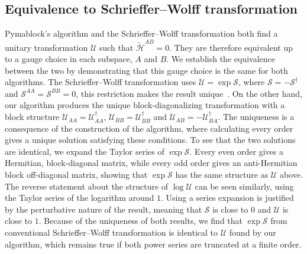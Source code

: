 \subsection{Equivalence to Schrieffer--Wolff transformation}
\label{seq:SW_equivalence}
Pymablock's algorithm and the Schrieffer--Wolff transformation both find a unitary transformation $\mathcal{U}$ such that $\tilde{\mathcal{H}}^{AB}=0$.
They are therefore equivalent up to a gauge choice in each subspace, $A$ and $B$.
We establish the equivalence between the two by demonstrating that this gauge choice is the same for both algorithms.
The Schrieffer--Wolff transformation uses $\mathcal{U} = \exp \mathcal{S}$, where $\mathcal{S} = -\mathcal{S}^\dagger$ and $\mathcal{S}^{AA} = \mathcal{S}^{BB} = 0$, this restriction makes the result unique~\cite{Bravyi_2011}.
On the other hand, our algorithm produces the unique block-diagonalizing transformation with a block structure $\mathcal{U}_{AA} = \mathcal{U}_{AA}^{\dag}$, $\mathcal{U}_{BB} = \mathcal{U}_{BB}^{\dag}$ and $\mathcal{U}_{AB} = -\mathcal{U}_{BA}^{\dag}$.
The uniqueness is a consequence of the construction of the algorithm, where calculating every order gives a unique solution satisfying these conditions.
To see that the two solutions are identical, we expand the Taylor series of $\exp \mathcal{S}$.
Every even order gives a Hermitian, block-diagonal matrix, while every odd order gives an anti-Hermitian block off-diagonal matrix, showing that $\exp \mathcal{S}$ has the same structure as $\mathcal{U}$ above.
The reverse statement about the structure of $\log \mathcal{U}$ can be seen similarly, using the Taylor series of the logarithm around $1$.
Using a series expansion is justified by the perturbative nature of the result, meaning that $\mathcal{S}$ is close to $0$ and $\mathcal{U}$ is close to $1$.
Because of the uniqueness of both results, we find that $\exp \mathcal{S}$ from conventional Schrieffer--Wolff transformation is identical to $\mathcal{U}$ found by our algorithm, which remains true if both power series are truncated at a finite order.

